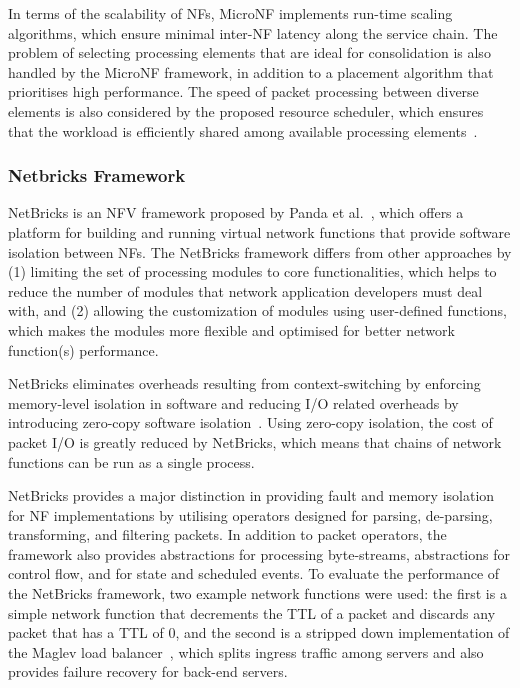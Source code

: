 \documentclass[futureinternet,review,accept,pdftex,moreauthors]{Definitions/mdpi}
\begin{document}
In terms of the scalability of NFs, MicroNF implements run-time scaling algorithms, which ensure minimal inter-NF latency along the service chain. The problem of selecting processing elements that are ideal for consolidation is also handled by the MicroNF framework, in addition to a placement algorithm that prioritises high performance. The speed of packet processing between diverse elements is also  considered by the proposed resource scheduler, which ensures that the workload is efficiently shared among available processing elements~\cite{meng2019micronf}.  

\subsubsection{Netbricks Framework}
\label{NetBricks}

NetBricks is an NFV framework proposed by Panda {et al.}~\cite{panda2016netbricks}, which offers a platform for building and running virtual network functions that provide software isolation between NFs. The NetBricks framework differs from other approaches by (1) limiting the set of processing modules to core functionalities, which helps to reduce the number of modules that network application developers must deal with, and (2) allowing the customization of modules using user-defined functions, which makes the modules more flexible and optimised for better network function(s) performance. 

NetBricks eliminates overheads resulting from context-switching by enforcing memory-level isolation in software and reducing I/O related overheads by introducing zero-copy software isolation~\cite{panda2016netbricks}. Using zero-copy isolation, the cost of packet I/O is greatly reduced by NetBricks, which means that chains of network functions can be run as a single process. 

NetBricks provides a major distinction in providing fault and memory isolation for NF implementations by utilising operators designed for parsing, de-parsing, transforming, and filtering packets. In addition to packet operators, the framework also provides abstractions for processing byte-streams, abstractions for control flow, and for state and scheduled events. To evaluate the performance of the NetBricks framework, two example network functions were used: the first is a simple network function that decrements the TTL of a packet and discards any packet that has a TTL of 0,  and the second is a stripped down implementation of the Maglev load balancer~\cite{eisenbud2016maglev}, which splits ingress traffic among servers and also provides failure recovery for back-end servers. 
\end{document}
